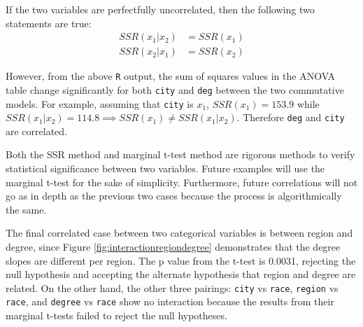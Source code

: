 \documentclass{article}
\begin{document}
      If the two variables are perfectfully uncorrelated, then the following two
      statements are true:
      \begin{align*}
        SSR(x_1 | x_2) &= SSR(x_1) \\
        SSR(x_2 | x_1) &= SSR(x_2)
      \end{align*}

      However, from the above \texttt{R} output, the sum of squares values in the
      ANOVA table change significantly for both \texttt{city} and \texttt{deg}
      between the two commutative models. For example, assuming that \texttt{city} is $x_1$,
      $SSR(x_1) = 153.9$ while $SSR(x_1 | x_2) = 114.8 \implies SSR(x_1) \neq SSR(x_1 | x_2)$.
      Therefore \texttt{deg} and \texttt{city} are correlated.

      Both the SSR method and marginal t-test method are rigorous methods to
      verify statistical significance between two variables. Future examples
      will use the marginal t-test for the sake of simplicity. Furthermore,
      future correlations will not go as in depth as the previous two cases
      because the process is algorithmically the same.

      The final correlated case between two categorical variables is between
      region and degree, since Figure \ref{fig:interactionregiondegree} demonstrates
      that the degree slopes are different per region. The p value from the
      t-test is 0.0031, rejecting the null hypothesis and accepting the alternate
      hypothesis that region and degree are related.
      On the other hand, the other three pairings:
      \texttt{city} vs \texttt{race}, \texttt{region} vs \texttt{race}, and
      \texttt{degree} vs \texttt{race} show no interaction because the results
      from their marginal t-tests failed to reject the null hypotheses. \\
\end{document}
